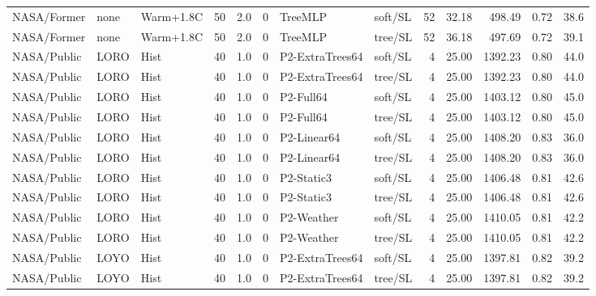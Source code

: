 \documentclass[10pt,a4paper]{article}
\begin{document}
\begin{landscape}
\begin{longtable}{llllllllrrrrr}
NASA/Former & none & Warm+1.8C & 50 & 2.0 & 0 & TreeMLP & soft/SL & 52 & 32.18 & 498.49 & 0.72 & 38.6 \\

NASA/Former & none & Warm+1.8C & 50 & 2.0 & 0 & TreeMLP & tree/SL & 52 & 36.18 & 497.69 & 0.72 & 39.1 \\

NASA/Public & LORO & Hist & 40 & 1.0 & 0 & P2-ExtraTrees64 & soft/SL & 4 & 25.00 & 1392.23 & 0.80 & 44.0 \\

NASA/Public & LORO & Hist & 40 & 1.0 & 0 & P2-ExtraTrees64 & tree/SL & 4 & 25.00 & 1392.23 & 0.80 & 44.0 \\

NASA/Public & LORO & Hist & 40 & 1.0 & 0 & P2-Full64 & soft/SL & 4 & 25.00 & 1403.12 & 0.80 & 45.0 \\

NASA/Public & LORO & Hist & 40 & 1.0 & 0 & P2-Full64 & tree/SL & 4 & 25.00 & 1403.12 & 0.80 & 45.0 \\

NASA/Public & LORO & Hist & 40 & 1.0 & 0 & P2-Linear64 & soft/SL & 4 & 25.00 & 1408.20 & 0.83 & 36.0 \\

NASA/Public & LORO & Hist & 40 & 1.0 & 0 & P2-Linear64 & tree/SL & 4 & 25.00 & 1408.20 & 0.83 & 36.0 \\

NASA/Public & LORO & Hist & 40 & 1.0 & 0 & P2-Static3 & soft/SL & 4 & 25.00 & 1406.48 & 0.81 & 42.6 \\

NASA/Public & LORO & Hist & 40 & 1.0 & 0 & P2-Static3 & tree/SL & 4 & 25.00 & 1406.48 & 0.81 & 42.6 \\

NASA/Public & LORO & Hist & 40 & 1.0 & 0 & P2-Weather & soft/SL & 4 & 25.00 & 1410.05 & 0.81 & 42.2 \\

NASA/Public & LORO & Hist & 40 & 1.0 & 0 & P2-Weather & tree/SL & 4 & 25.00 & 1410.05 & 0.81 & 42.2 \\

NASA/Public & LOYO & Hist & 40 & 1.0 & 0 & P2-ExtraTrees64 & soft/SL & 4 & 25.00 & 1397.81 & 0.82 & 39.2 \\

NASA/Public & LOYO & Hist & 40 & 1.0 & 0 & P2-ExtraTrees64 & tree/SL & 4 & 25.00 & 1397.81 & 0.82 & 39.2 \\


\end{longtable}
\end{landscape}
\end{document}
